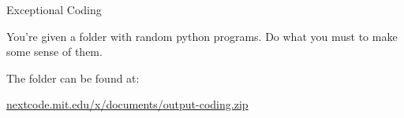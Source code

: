 \documentclass[12pt]{article}
\begin{document}
\Large

\vspace*{10px}
\begin{center}
\huge{Exceptional Coding}
\end{center}
\vspace*{10px}

\vspace{.2in}

You're given a folder with random python programs. Do what you must to make some sense of them.

\begin{center}
\underline{\hspace{1cm}} \underline{\hspace{1cm}} \underline{\hspace{1cm}} \underline{\hspace{1cm}} \underline{\hspace{1cm}} \underline{\hspace{1cm}} \underline{\hspace{1cm}} \underline{\hspace{1cm}} 
\end{center}

\vspace{.2in}

\Large{The folder can be found at:} 
\begin{center}
\underline{nextcode.mit.edu/x/documents/output-coding.zip}
\end{center}
\end{document}
